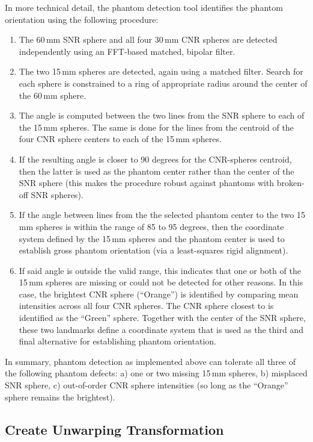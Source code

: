 \documentclass{InsightArticle}
\begin{document}
In more technical detail, the phantom detection tool identifies the phantom
orientation using the following procedure:
\begin{enumerate}
\item The 60\,mm SNR sphere and all four 30\,mm CNR spheres are detected
  independently using an FFT-based matched, bipolar filter. 
\item The two 15\,mm spheres are detected, again using a matched
  filter. Search for each sphere is constrained to a ring of
  appropriate radius around the center of the 60\,mm sphere.
\item The angle is computed between the two lines from the SNR sphere to each
  of the 15\,mm spheres. The same is done for the lines from the centroid 
  of the four CNR sphere centers to each of the 15\,mm spheres.
\item If the resulting angle is closer to 90 degrees for the CNR-spheres
  centroid, then the latter is used as the phantom center rather than the
  center of the SNR sphere (this makes the procedure robust against phantoms
  with broken-off SNR spheres).
\item If the angle between lines from the the selected phantom center to the
  two 15\,mm spheres is within the range of 85 to 95 degrees, then the
  coordinate system defined by the 15\,mm spheres and the phantom center is
  used to establish gross phantom orientation (via a least-squares rigid
  alignment).
\item If said angle is outside the valid range, this indicates that one or
  both of the 15\,mm spheres are missing or could not be detected for other
  reasons. In this case, the brightest CNR sphere (``Orange'') is identified
  by comparing mean intensities across all four CNR spheres. The CNR sphere
  closest to is identified as the ``Green'' sphere. Together with the center
  of the SNR sphere, these two landmarks define a coordinate system that is
  used as the third and final alternative for establishing phantom
  orientation.
\end{enumerate}

In summary, phantom detection as implemented above can tolerate all three of
the following phantom defects: a) one or two missing 15\,mm spheres, b)
misplaced SNR sphere, c) out-of-order CNR sphere intensities (so long as the
``Orange'' sphere remains the brightest).

\subsection{Create Unwarping Transformation}
\end{document}

